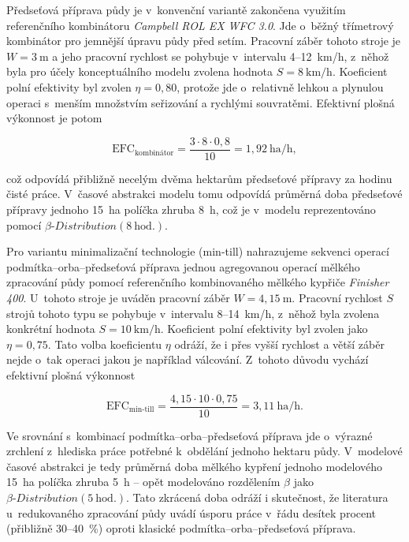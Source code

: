 \documentclass[11pt,a4paper]{article}
\newcounter{subsubsubsection}[subsubsection]
\begin{document}

Předseťová příprava půdy je v~konvenční variantě zakončena využitím referenčního kombinátoru \emph{Campbell ROL EX WFC 3.0}\cite{eshop-zp-kombinátor}. Jde o~běžný třímetrový kombinátor pro jemnější úpravu půdy před setím. Pracovní záběr tohoto stroje je $W = 3~\text{m}$ a jeho pracovní rychlost se pohybuje v~intervalu 4--12~km/h, z~něhož byla pro účely konceptuálního modelu zvolena hodnota $S = 8~\text{km/h}$. Koeficient polní efektivity byl zvolen $\eta = 0,80$, protože jde o~relativně lehkou a plynulou operaci s~menším množstvím seřizování a rychlými souvratěmi. Efektivní plošná výkonnost je potom

$$
\text{EFC}_{\text{kombinátor}} = \frac{3 \cdot 8 \cdot 0,8}{10} = 1,92~\text{ha/h},
$$

což odpovídá přibližně necelým dvěma hektarům předseťové přípravy za hodinu čisté práce. V~časové abstrakci modelu tomu odpovídá průměrná doba předseťové přípravy jednoho 15~ha políčka zhruba 8~h, což je v~modelu reprezentováno pomocí $\beta\text{-}Distribution(8~\text{hod.})$.


Pro variantu minimalizační technologie (min-till) nahrazujeme sekvenci operací podmítka--orba--předseťová příprava jednou agregovanou operací mělkého zpracování půdy pomocí referenčního kombinovaného mělkého kypřiče \emph{Finisher 400}\cite{eshop-fomex-kombinovaný-kypřič}. U~tohoto stroje je uváděn pracovní záběr $W = 4,15~\text{m}$. Pracovní rychlost $S$ strojů tohoto typu se pohybuje v~intervalu 8--14~km/h, z~něhož byla zvolena konkrétní hodnota $S = 10~\text{km/h}$. Koeficient polní efektivity byl zvolen jako $\eta = 0,75$. Tato volba koeficientu $\eta$ odráží, že i přes vyšší rychlost a větší záběr nejde o~tak  operaci jakou je například válcování. Z~tohoto důvodu vychází efektivní plošná výkonnost

$$
\text{EFC}_{\text{min-till}} = \frac{4,15 \cdot 10 \cdot 0,75}{10} = 3,11~\text{ha/h}.
$$

Ve srovnání s~kombinací podmítka--orba--předseťová příprava jde o~výrazné zrchlení z~hlediska práce potřebné k~obdělání jednoho hektaru půdy. V~modelové časové abstrakci je tedy průměrná doba mělkého kypření jednoho modelového 15~ha políčka zhruba 5~h -- opět modelováno rozdělením $\beta$ jako $\beta\text{-}Distribution(5~\text{hod.})$. Tato zkrácená doba odráží i skutečnost, že literatura u~redukovaného zpracování půdy uvádí úsporu práce v~řádu desítek procent (přibližně 30--40~\%) oproti klasické podmítka--orba--předseťová příprava\cite{eurostat-tillage-comparison}.
\end{document}
